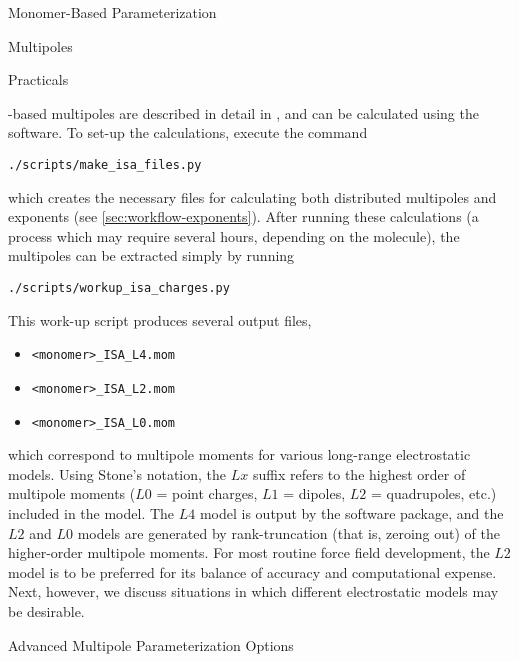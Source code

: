 \begin{section}{Monomer-Based Parameterization}
\begin{subsection}{Multipoles}
\begin{subsubsection}{Practicals}

\isa-based multipoles are described in detail in , and can
be calculated using the \camcasp software. To set-up the \isa calculations,
execute the command
%
\begin{lstlisting}
./scripts/make_isa_files.py
\end{lstlisting}
%
which creates the necessary \isa files for calculating both distributed
multipoles and exponents (see \cref{sec:workflow-exponents}). After running
these calculations (a process which may require several hours, depending on
the molecule), the multipoles can be extracted simply by running
%
\begin{lstlisting}
./scripts/workup_isa_charges.py
\end{lstlisting}
%
This work-up script produces several output files,
\begin{itemize}[noitemsep,label=]
\item \verb|<monomer>_ISA_L4.mom|
\item \verb|<monomer>_ISA_L2.mom|
\item \verb|<monomer>_ISA_L0.mom|
\end{itemize}
which correspond to multipole moments for various long-range electrostatic
models. Using Stone's notation,\cite{stone2013theory} the $Lx$ suffix refers
to the highest order of multipole moments ($L0$ = point charges, $L1$ =
dipoles, $L2$ = quadrupoles, etc.) included in the model. The $L4$ model is
output by the \camcasp software package, and the $L2$ and $L0$ models are
generated by rank-truncation (that is, zeroing out) of the higher-order multipole
moments. 
For most routine
force field development, the $L2$ model is to be preferred for its balance of
accuracy and computational expense. Next, however, we
discuss situations in which different electrostatic models may be desirable.

\end{subsubsection}
\begin{subsubsection}{Advanced Multipole Parameterization Options}


\end{subsubsection}
\end{subsection}
\end{section}
